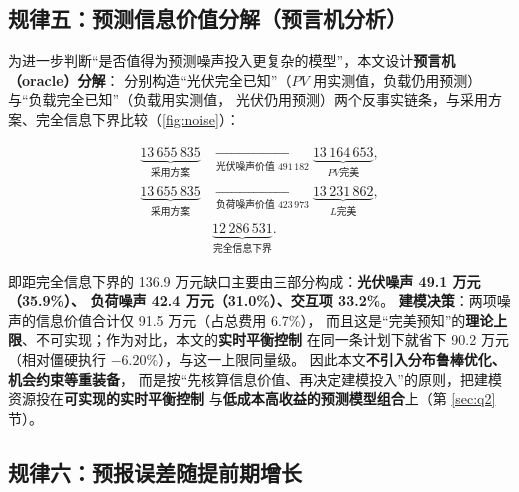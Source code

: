 \documentclass[12pt,a4paper,fontset=fandol]{ctexart}
\begin{document}
\subsection{规律五\nobreak：预测信息价值分解（预言机分析\nobreak）}

为进一步判断“是否值得为预测噪声投入更复杂的模型\nobreak”\nobreak，本文设计\textbf{预言机（oracle\nobreak）分解}\nobreak：
分别构造“光伏完全已知\nobreak”（$PV$ 用实测值\nobreak，负载仍用预测\nobreak）与“负载完全已知\nobreak”（负载用实测值\nobreak，
光伏仍用预测\nobreak）两个反事实链条\nobreak，与采用方案\nobreak、完全信息下界比较（\cref{fig:noise}\nobreak）\nobreak：

\begin{equation}
\begin{aligned}
\underbrace{13\,655\,835}_{\text{采用方案}}
&\xrightarrow[\text{光伏噪声价值 }491\,182]{}
\underbrace{13\,164\,653}_{PV\text{完美}},\\
\underbrace{13\,655\,835}_{\text{采用方案}}
&\xrightarrow[\text{负荷噪声价值 }423\,973]{}
\underbrace{13\,231\,862}_{L\text{完美}},\\
&\underbrace{12\,286\,531}_{\text{完全信息下界}} .
\end{aligned}
\end{equation}

即距完全信息下界的 136.9 万元缺口主要由三部分构成\nobreak：\textbf{光伏噪声 49.1 万元（35.9\%\nobreak）\nobreak、
负荷噪声 42.4 万元（31.0\%\nobreak）\nobreak、交互项 33.2\%}\nobreak。
\textbf{建模决策}\nobreak：两项噪声的信息价值合计仅 91.5 万元（占总费用 6.7\%\nobreak）\nobreak，
而且这是“完美预知\nobreak”的\textbf{理论上限}\nobreak、不可实现\nobreak；作为对比\nobreak，本文的\textbf{实时平衡控制}
在同一条计划下就省下 90.2 万元（相对僵硬执行 $-6.20\text{\%}$\nobreak）\nobreak，与这一上限同量级\nobreak。
因此本文\textbf{不引入分布鲁棒优化\nobreak、机会约束等重装备}\nobreak，
而是按“先核算信息价值\nobreak、再决定建模投入\nobreak”的原则\nobreak，把建模资源投在\textbf{可实现的实时平衡控制}
与\textbf{低成本高收益的预测模型组合}上（第 \ref{sec:q2} 节\nobreak）\nobreak。

\subsection{规律六\nobreak：预报误差随提前期增长}
\end{document}
